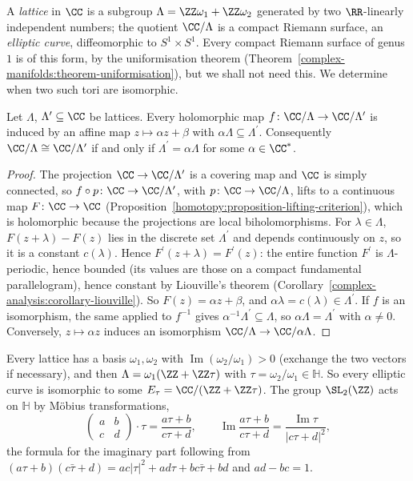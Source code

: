 A \emph{lattice} in $\CC$ is a subgroup $\Lambda = \ZZ\omega_1 + \ZZ\omega_2$ generated by two $\RR$-linearly independent numbers; the quotient $\CC/\Lambda$ is a compact Riemann surface, an \emph{elliptic curve},
diffeomorphic to $S^1 \times S^1$. Every compact Riemann surface of genus $1$ is of this form, by the uniformisation theorem (Theorem~\ref{complex-manifolds:theorem-uniformisation}), but we shall not need this.
We determine when two such tori are isomorphic.

\begin{proposition}\label{deformations:proposition-tori-isomorphic}
Let $\Lambda$, $\Lambda^{\prime} \subseteq \CC$ be lattices. Every holomorphic map $f \colon \CC/\Lambda \to \CC/\Lambda^{\prime}$ is induced by an affine map $z \mapsto \alpha z + \beta$ with $\alpha\Lambda \subseteq \Lambda^{\prime}$.
Consequently $\CC/\Lambda \cong \CC/\Lambda^{\prime}$ if and only if $\Lambda^{\prime} = \alpha\Lambda$ for some $\alpha \in \CC^*$.
\end{proposition}

\begin{proof}
The projection $\CC \to \CC/\Lambda^{\prime}$ is a covering map and $\CC$ is simply connected, so $f \circ p \colon \CC \to \CC/\Lambda^{\prime}$, with $p \colon \CC \to \CC/\Lambda$, lifts to a continuous map
$F \colon \CC \to \CC$ (Proposition~\ref{homotopy:proposition-lifting-criterion}), which is holomorphic because the projections are local biholomorphisms. For $\lambda \in \Lambda$, $F(z + \lambda) - F(z)$ lies in
the discrete set $\Lambda^{\prime}$ and depends continuously on $z$, so it is a constant $c(\lambda)$. Hence $F^{\prime}(z + \lambda) = F^{\prime}(z)$: the entire function $F^{\prime}$ is $\Lambda$-periodic, hence bounded
(its values are those on a compact fundamental parallelogram), hence constant by Liouville's theorem (Corollary~\ref{complex-analysis:corollary-liouville}). So $F(z) = \alpha z + \beta$, and
$\alpha\lambda = c(\lambda) \in \Lambda^{\prime}$. If $f$ is an isomorphism, the same applied to $f^{-1}$ gives $\alpha^{-1}\Lambda^{\prime} \subseteq \Lambda$, so $\alpha\Lambda = \Lambda^{\prime}$ with $\alpha \neq 0$. Conversely,
$z \mapsto \alpha z$ induces an isomorphism $\CC/\Lambda \to \CC/\alpha\Lambda$.
\end{proof}

Every lattice has a basis $\omega_1, \omega_2$ with $\operatorname{Im}(\omega_2/\omega_1) > 0$ (exchange the two vectors if necessary), and then $\Lambda = \omega_1(\ZZ + \ZZ\tau)$ with $\tau = \omega_2/\omega_1 \in \mathbb{H}$.
So every elliptic curve is isomorphic to some $E_\tau = \CC/(\ZZ + \ZZ\tau)$. The group $\SL_2(\ZZ)$ acts on $\mathbb{H}$ by Möbius transformations,
\[
\begin{pmatrix}a & b\\ c & d\end{pmatrix}\cdot\tau = \frac{a\tau + b}{c\tau + d}, \qquad \operatorname{Im}\frac{a\tau + b}{c\tau + d} = \frac{\operatorname{Im}\tau}{|c\tau + d|^2},
\]
the formula for the imaginary part following from $(a\tau + b)(c\bar\tau + d) = ac|\tau|^2 + ad\tau + bc\bar\tau + bd$ and $ad - bc = 1$.

